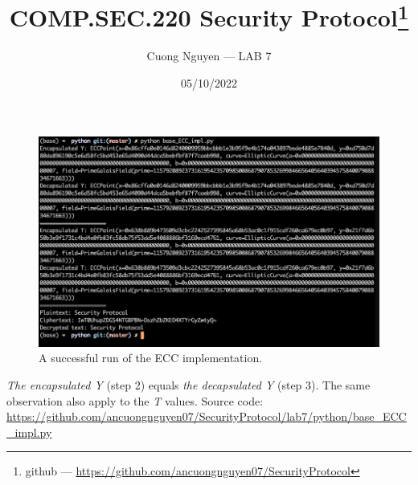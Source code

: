 \documentclass{article}
\title{COMP.SEC.220 Security Protocol\footnote{github --- \url{https://github.com/ancuongnguyen07/SecurityProtocol}}}
\author{Cuong Nguyen --- LAB 7}
\date{05/10/2022}
\begin{document}
    
\maketitle

\begin{figure}[hpt]
    \centering
    \includegraphics[height=\textheight,width=\textwidth,keepaspectratio
                    ]{sucessful_run.png}
    \caption{A successful run of the ECC implementation.}
\end{figure}

\emph{The encapsulated Y} (step 2) equals \emph{the decapsulated Y} (step 3).
The same observation also apply to the \emph{T} values. Source code:
\url{https://github.com/ancuongnguyen07/SecurityProtocol/lab7/python/base_ECC_impl.py}
\end{document}
